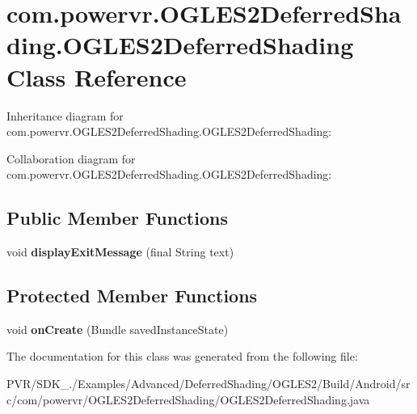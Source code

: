 \hypertarget{classcom_1_1powervr_1_1_o_g_l_e_s2_deferred_shading_1_1_o_g_l_e_s2_deferred_shading}{\section{com.\+powervr.\+O\+G\+L\+E\+S2\+Deferred\+Shading.\+O\+G\+L\+E\+S2\+Deferred\+Shading Class Reference}
\label{classcom_1_1powervr_1_1_o_g_l_e_s2_deferred_shading_1_1_o_g_l_e_s2_deferred_shading}
}


Inheritance diagram for com.\+powervr.\+O\+G\+L\+E\+S2\+Deferred\+Shading.\+O\+G\+L\+E\+S2\+Deferred\+Shading\+:


Collaboration diagram for com.\+powervr.\+O\+G\+L\+E\+S2\+Deferred\+Shading.\+O\+G\+L\+E\+S2\+Deferred\+Shading\+:
\subsection*{Public Member Functions}
\begin{DoxyCompactItemize}
\item 
\hypertarget{classcom_1_1powervr_1_1_o_g_l_e_s2_deferred_shading_1_1_o_g_l_e_s2_deferred_shading_a222371224893ddafd37acbfce7660d9b}{void {\bfseries display\+Exit\+Message} (final String text)}\label{classcom_1_1powervr_1_1_o_g_l_e_s2_deferred_shading_1_1_o_g_l_e_s2_deferred_shading_a222371224893ddafd37acbfce7660d9b}

\end{DoxyCompactItemize}
\subsection*{Protected Member Functions}
\begin{DoxyCompactItemize}
\item 
\hypertarget{classcom_1_1powervr_1_1_o_g_l_e_s2_deferred_shading_1_1_o_g_l_e_s2_deferred_shading_a2359e5df4b65f357992b034e487ce2e4}{void {\bfseries on\+Create} (Bundle saved\+Instance\+State)}\label{classcom_1_1powervr_1_1_o_g_l_e_s2_deferred_shading_1_1_o_g_l_e_s2_deferred_shading_a2359e5df4b65f357992b034e487ce2e4}

\end{DoxyCompactItemize}


The documentation for this class was generated from the following file\+:\begin{DoxyCompactItemize}
\item 
P\+V\+R/\+S\+D\+K\+\_./\+Examples/\+Advanced/\+Deferred\+Shading/\+O\+G\+L\+E\+S2/\+Build/\+Android/src/com/powervr/\+O\+G\+L\+E\+S2\+Deferred\+Shading/O\+G\+L\+E\+S2\+Deferred\+Shading.\+java\end{DoxyCompactItemize}

